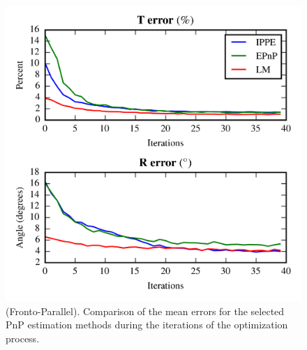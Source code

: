 \documentclass[letterpaper, 10 pt, conference]{ieeeconf}  %
\begin{document}
	\begin{figure}[t]
		\begin{center}
			\includegraphics[width=\columnwidth]{img/pose_together_fronto_parallel.png}
			\caption{\label{fig:FP_pnp_results_global}\small  (Fronto-Parallel). Comparison of the mean errors for the selected PnP estimation methods during the iterations of the optimization process.}
		\end{center}
		\vspace{-0.5cm}
	\end{figure}
	
\end{document}
